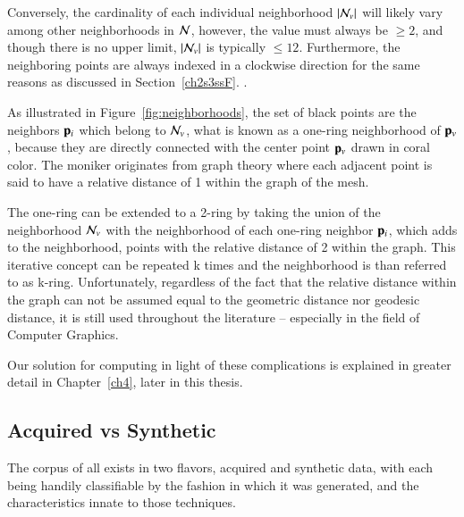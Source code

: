 {{Conversely, the cardinality of each individual neighborhood $|\mathcal{N}_v|$ will likely vary among other neighborhoods in $\mathcal{N}$, however, the value must always be $\geq 2$, and though there is no upper limit, $|\mathcal{N}_v|$ is typically $\leq 12$. Furthermore, the neighboring points are always indexed in a clockwise direction for the same reasons as discussed in Section~\ref{ch2s3ssF}.
.%

As illustrated in Figure~\ref{fig:neighborhoods}, the set of black points are the neighbors $\mathbf{p}_i$ which belong to $\mathcal{N}_v$, what is known as a one-ring neighborhood of $\mathbf{p}_v$, because they are directly connected with the center point $\mathbf{p}_v$ drawn in coral color. The moniker originates from graph theory where each adjacent point is said to have a relative distance of 1 within the graph of the mesh. 

The one-ring can be extended to a 2-ring by taking the union of the neighborhood $\mathcal{N}_v$ with the neighborhood of each one-ring neighbor $\mathbf{p}_i$, which adds to the neighborhood, points with the relative distance of 2 within the graph. This iterative concept can be repeated k times and the neighborhood is than referred to as k-ring. Unfortunately, regardless of the fact that the relative distance within the graph can not be assumed equal to the geometric distance nor geodesic distance, it is still used throughout the literature – especially in the field of Computer Graphics.~\cite[p.~29]{Mara12}

Our solution for computing  in light of these complications is explained in greater detail in Chapter~\ref{ch4}, later in this thesis.

%
%
%
\subsection{Acquired vs Synthetic \tdd{}}
\label{ch2s3ssAVS3}
The corpus of all \tdd{} exists in two flavors, acquired and synthetic data, with each being handily classifiable by the fashion in which it was generated, and the characteristics innate to those techniques.

}}
